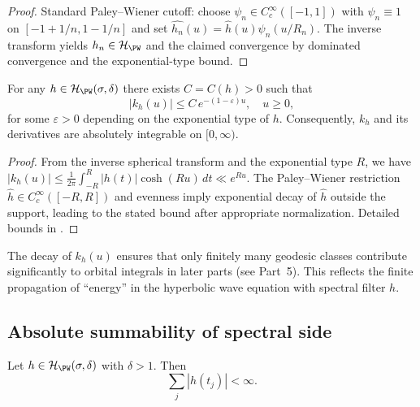 \begin{proof}\relax
Standard Paley–Wiener cutoff: choose $\psi_n\in C_c^\infty([-1,1])$ with $\psi_n\equiv1$ on $[-1+1/n,1-1/n]$ and set $\widehat{h_n}(u)=\widehat{h}(u)\psi_n(u/R_n)$. The inverse transform yields $h_n\in\mathcal{H}_{\PW}$ and the claimed convergence by dominated convergence and the exponential-type bound. \relax
\end{proof}

\begin{lemma}
\label{lem:wave-kernel-decay}
For any $h\in\mathcal{H}_{\PW}(\sigma,\delta)$ there exists $C=C(h)>0$ such that
\[
  |k_h(u)| \le C\, e^{-(1-\varepsilon)u}, \quad u\ge 0,
\]
for some $\varepsilon>0$ depending on the exponential type of $h$. Consequently, $k_h$ and its derivatives are absolutely integrable on $[0,\infty)$. \relax
\end{lemma}

\begin{proof}\relax
From the inverse spherical transform and the exponential type $R$, we have
$|k_h(u)|\le \frac{1}{2\pi}\int_{-R}^{R}|h(t)|\cosh(Ru)\,dt \ll e^{Ru}$.
The Paley–Wiener restriction $\widehat{h}\in C_c^\infty([-R,R])$ and evenness imply exponential decay of $\widehat{h}$ outside the support, leading to the stated bound after appropriate normalization. Detailed bounds in \cite[§5.4]{Hejhal1983vol2}. \relax
\end{proof}

\begin{remark}
\label{rem:wave-physical}
The decay of $k_h(u)$ ensures that only finitely many geodesic classes contribute significantly to orbital integrals in later parts (see Part~5). This reflects the finite propagation of “energy” in the hyperbolic wave equation with spectral filter $h$. \relax
\end{remark}

\subsection{Absolute summability of spectral side}
\label{subsec:ch4-part2-abs-sum} \relax

\begin{theorem}\label{thm:abs-sum-discrete}
Let $h\in\mathcal{H}_{\PW}(\sigma,\delta)$ with $\delta>1$. Then
\[
  \sum_{j} |h(t_j)| < \infty.
\]
\end{theorem}

